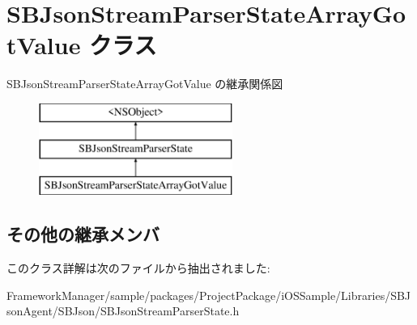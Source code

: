 \hypertarget{interface_s_b_json_stream_parser_state_array_got_value}{}\section{S\+B\+Json\+Stream\+Parser\+State\+Array\+Got\+Value クラス}
\label{interface_s_b_json_stream_parser_state_array_got_value}
S\+B\+Json\+Stream\+Parser\+State\+Array\+Got\+Value の継承関係図\begin{figure}[H]
\begin{center}
\leavevmode
\includegraphics[height=3.000000cm]{interface_s_b_json_stream_parser_state_array_got_value}
\end{center}
\end{figure}
\subsection*{その他の継承メンバ}


このクラス詳解は次のファイルから抽出されました\+:\begin{DoxyCompactItemize}
\item 
Framework\+Manager/sample/packages/\+Project\+Package/i\+O\+S\+Sample/\+Libraries/\+S\+B\+Json\+Agent/\+S\+B\+Json/S\+B\+Json\+Stream\+Parser\+State.\+h\end{DoxyCompactItemize}
